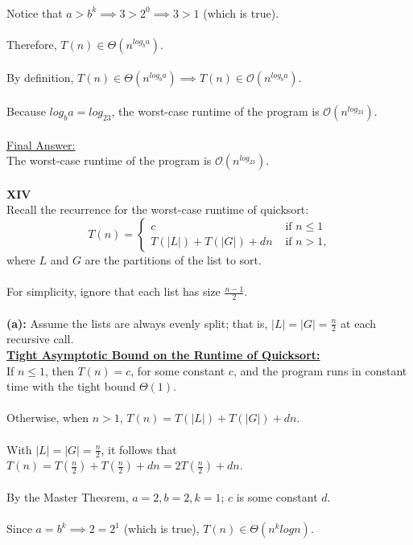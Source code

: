 \documentclass[12pt]{article}
\begin{document}
\\
Notice that $a > b^k \implies 3 > 2^0 \implies 3 > 1$ (which is true). \\
\\
Therefore, $T(n) \in \Theta (n^{log_ba})$. \\
\\
By definition, $T(n) \in \Theta (n^{log_ba}) \implies T(n) \in \mathcal{O} (n^{log_ba})$. \\
\\
Because $log_ba = log_23$, the worst-case runtime of the program is $\mathcal{O} (n^{log_23})$. \\
\\
\underline{Final Answer:} \\
The worst-case runtime of the program is $\mathcal{O} (n^{log_23})$. \\
\\
\textbf{XIV} \\
Recall the recurrence for the worst-case runtime of quicksort:
\[ T(n) =
\begin{cases}
    c &\text{ if } n \leq 1 \\
    T(|L|) + T(|G|) + dn &\text{ if } n > 1 \text{,}
\end{cases}
\] where $L$ and $G$ are the partitions of the list to sort. \\
\\
For simplicity, ignore that each list has size \(\frac{n-1}{2}\). \\
\\
\textbf{(a):} Assume the lists are always evenly split; that is, \(|L| = |G| = \frac{n}{2}\) at each recursive call. \\
\textbf{\underline{Tight Asymptotic Bound on the Runtime of Quicksort:}} \\
If $n \leq 1$, then $T(n) = c$, for some constant $c$, and the program runs in constant time with the tight bound $\Theta (1)$. \\
\\
Otherwise, when $n > 1$, $T(n) = T(|L|) + T(|G|) + dn$. \\
\\
With $|L| = |G| = \frac{n}{2}$, it follows that $T(n) = T(\frac{n}{2}) + T(\frac{n}{2}) + dn = 2T(\frac{n}{2}) + dn$. \\
\\
By the Master Theorem, $a = 2, b = 2, k = 1$; $c$ is some constant $d$. \\
\\
Since $a = b^k \implies 2 = 2^1$ (which is true), $T(n) \in \Theta (n^k logn)$. \\
\end{document}
